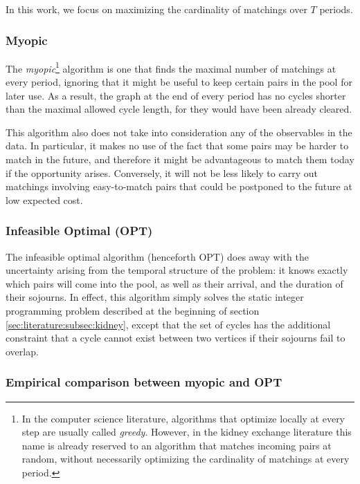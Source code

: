 \documentclass[12pt]{article}
\begin{document}
In this work, we focus on maximizing the cardinality of matchings over $T$ periods. 


\subsubsection{Myopic}

The \emph{myopic}\footnote{In the computer science literature, algorithms that optimize locally at every step are usually called \emph{greedy}. However, in the kidney exchange literature this name is already reserved to an algorithm that matches incoming pairs at random, without necessarily optimizing the cardinality of matchings at every period.} algorithm is one that finds the maximal number of matchings at every period, ignoring that it might be useful to keep certain pairs in the pool for later use. As a result, the graph at the end of every period has no cycles shorter than the maximal allowed cycle length, for they would have been already cleared.

This algorithm also does not take into consideration any of the observables in the data. In particular, it makes no use of the fact that some pairs may be harder to match in the future, and therefore it might be advantageous to match them today if the opportunity arises. Conversely, it will not be less likely to carry out matchings involving easy-to-match pairs that could be postponed to the future at low expected cost.


\subsubsection{Infeasible Optimal (OPT)}

The infeasible optimal algorithm (henceforth OPT) does away with the uncertainty arising from the temporal structure of the problem: it knows exactly which pairs will come into the pool, as well as their arrival, and the duration of their sojourns. In effect, this algorithm simply solves the static integer programming problem described at the beginning of section \ref{sec:literature:subsec:kidney}, except that the set of cycles has the additional constraint that a cycle cannot exist between two vertices if their sojourns fail to overlap.



\subsubsection{Empirical comparison between myopic and OPT}
\end{document}
